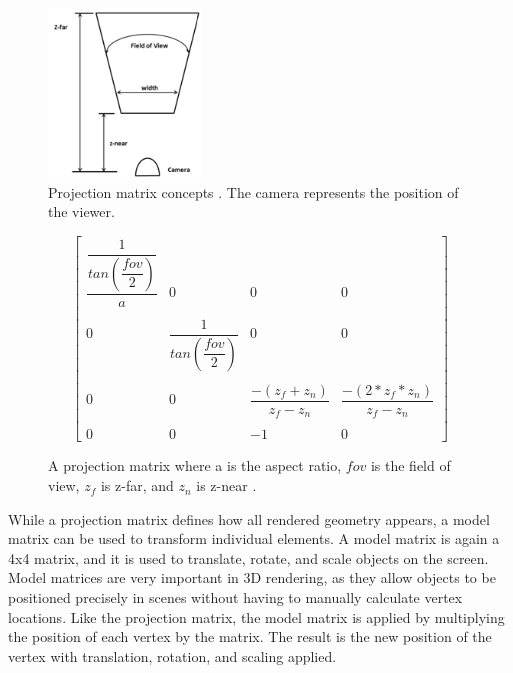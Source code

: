 \documentclass{article}
\begin{document}
\begin{figure}[h]
	\centering
	\includegraphics[height=4.5cm]{projection-matrix}
	\caption{Projection matrix concepts \cite{hernandez2019}. The camera represents the position of the viewer.}
	\label{fig:projection}
\end{figure}

\begin{figure}[h]
    \[
	  \begin{bmatrix}
        \dfrac{\dfrac{1}{tan(\dfrac{\mathit{fov}}{2})}}{a} &
        0 &
        0 &
        0 \\ \\
        0 &
        \dfrac{1}{tan(\dfrac{\mathit{fov}}{2})} &
        0 &
        0 \\ \\
        0 &
        0 &
        \dfrac{-(z_f + z_n)}{z_f - z_n} &
        \dfrac{-(2 * z_f * z_n)}{z_f - z_n} \\ \\
        0 &
        0 &
        -1 &
        0
      \end{bmatrix}
    \]
    \caption{A projection matrix where a is the aspect ratio, $\mathit{fov}$ is the field of view, $z_f$ is z-far, and $z_n$ is z-near \cite{hernandez2019}.}
    \label{fig:matrix}
\end{figure}

While a projection matrix defines how all rendered geometry appears, a model matrix can be used to transform individual elements. A model matrix is again a 4x4 matrix, and it is used to translate, rotate, and scale objects on the screen. Model matrices are very important in 3D rendering, as they allow objects to be positioned precisely in scenes without having to manually calculate vertex locations. Like the projection matrix, the model matrix is applied by multiplying the position of each vertex by the matrix. The result is the new position of the vertex with translation, rotation, and scaling applied.
\end{document}
